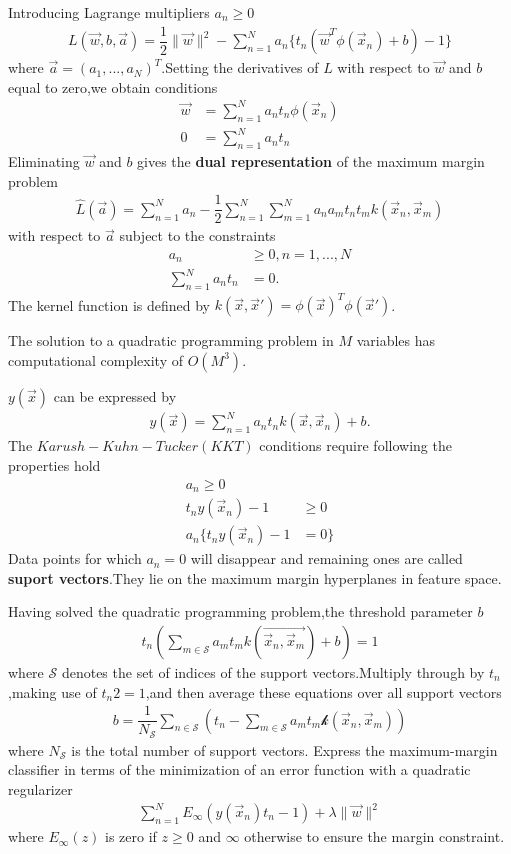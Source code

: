 Introducing Lagrange multipliers $a_n\geq 0$
\begin{align}
L(\vec{w},b,\vec{a}) = \dfrac{1}{2}\parallel\vec{w}\parallel^2-
\sum_{n=1}^{N}a_n\{ t_n(\vec{w}^T\phi(\vec{x}_n)+b)-1 \}
\end{align}
where $\vec{a} = (a_1,...,a_N)^T$.Setting the derivatives of $L$ with respect to $\vec{w}$ and $b$ equal to zero,we obtain conditions
\begin{align}
\vec{w}&=\sum_{n=1}^{N}a_n t_n\phi(\vec{x}_n) \\
0 &=\sum_{n=1}^{N}a_n t_n
\end{align}
Eliminating $\vec{w}$ and $b$ gives the \textbf{dual representation} of the maximum margin problem
\begin{align}
\hat{L}(\vec{a})=\sum_{n=1}^{N}a_n -\dfrac{1}{2}\sum_{n=1}^{N}\sum_{m=1}^{N}a_n a_m t_n t_m k(\vec{x}_n,\vec{x}_m)
\end{align}
with respect to $\vec{a}$ subject to the constraints
\begin{align}
a_n &\geq 0,n =1,...,N \\
\sum_{n=1}^{N}a_n t_n &= 0.
\end{align}
The kernel function is defined by $k(\vec{x},\vec{x}') = \phi(\vec{x})^T\phi(\vec{x}')$.

The solution to a quadratic programming problem in $M$ variables has computational complexity of $O(M^3)$.

$y(\vec{x})$ can be expressed by
\begin{align}
y(\vec{x}) = \sum_{n=1}^{N}a_n t_n k(\vec{x},\vec{x}_n) + b.
\end{align}
The $Karush-Kuhn-Tucker(KKT)$ conditions require following the properties hold
\begin{align}
a_n \geq 0 \\
t_n y(\vec{x}_n) -1 &\geq 0 \\
a_n\{t_n y(\vec{x}_n) -1 &= 0\}
\end{align}
Data points for which $a_n=0$ will disappear and remaining ones are called \textbf{suport vectors}.They lie on the maximum margin hyperplanes in feature space.

Having solved the quadratic programming problem,the threshold parameter $b$
\begin{align}
t_n(\sum_{m\in \mathcal{S}}{a_m t_m k(\vec{\vec{x}_n,\vec{x}_m})+b}) =1
\end{align}
where $\mathcal{S}$ denotes the set of indices of the support vectors.Multiply through by $t_n$,making use of $t_n2=1$,and then average these equations over all support vectors
\begin{align}
b=\dfrac{1}{N_{\mathcal{S}}}\sum_{n\in\mathcal{S}}(t_n-\sum_{m\in\mathcal{S}}a_m t_m \mathcal{k}(\vec{x}_n,\vec{x}_m))
\end{align}
where $N_{\mathcal{S}}$ is the total number of support vectors.
Express the maximum-margin classifier in terms of the minimization of an error function with a quadratic regularizer
\begin{align}
\sum_{n=1}^{N}E_{\infty}(y(\vec{x}_n)t_n-1) + \lambda\parallel\vec{w}\parallel^2
\end{align}
where $E_{\infty}(z)$ is zero if $z\geq 0$ and $\infty$ otherwise to ensure the margin constraint.

